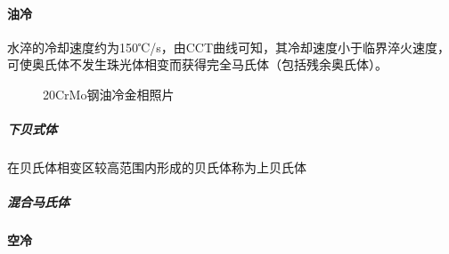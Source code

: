 \documentclass[12pt]{ctexart}
\begin{document}
\paragraph{油冷}
水淬的冷却速度约为150℃/s，由CCT曲线可知，其冷却速度小于临界淬火速度，可使奥氏体不发生珠光体相变而获得完全马氏体（包括残余奥氏体）。
\newpage
\begin{figure}[h]
  \centering
  \caption{20CrMo钢油冷金相照片}
  \label{20water}
\end{figure}
\subparagraph{下贝式体}
在贝氏体相变区较高范围内形成的贝氏体称为上贝氏体
\subparagraph{混合马氏体}
\paragraph{空冷}
\end{document}
